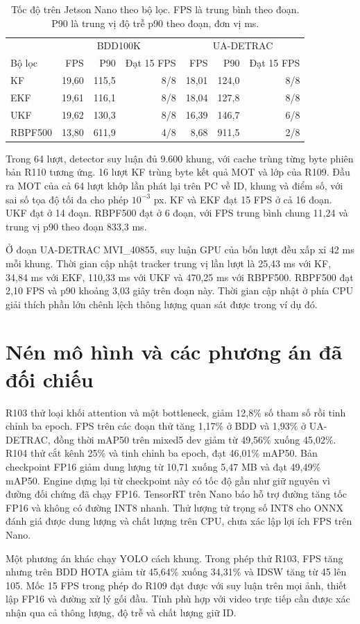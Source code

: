 \begin{table}[htbp]\centering\small
\caption{Tốc độ trên Jetson Nano theo bộ lọc. FPS là trung bình theo đoạn. P90 là trung vị độ trễ p90 theo đoạn, đơn vị ms.}\label{tab:nano-r114}
\begin{tabular}{@{}lrrrrrr@{}}\toprule
 & \multicolumn{3}{c}{BDD100K} & \multicolumn{3}{c}{UA-DETRAC}\\
Bộ lọc & FPS & P90 & Đạt 15 FPS & FPS & P90 & Đạt 15 FPS\\\midrule
KF & 19,60 & 115,5 & 8/8 & 18,01 & 124,0 & 8/8\\
EKF & 19,61 & 116,1 & 8/8 & 18,04 & 127,8 & 8/8\\
UKF & 19,62 & 130,3 & 8/8 & 16,39 & 146,7 & 6/8\\
RBPF500 & 13,80 & 611,9 & 4/8 & 8,68 & 911,5 & 2/8\\\bottomrule
\end{tabular}
\end{table}

Trong 64 lượt, detector suy luận đủ 9.600 khung, với cache trùng từng byte phiên bản R110 tương ứng. 16 lượt KF trùng byte kết quả MOT và lớp của R109. Đầu ra MOT của cả 64 lượt khớp lần phát lại trên PC về ID, khung và điểm số, với sai số tọa độ tối đa cho phép $10^{-3}$ px. KF và EKF đạt 15 FPS ở cả 16 đoạn. UKF đạt ở 14 đoạn. RBPF500 đạt ở 6 đoạn, với FPS trung bình chung 11,24 và trung vị p90 theo đoạn 833,3 ms.

Ở đoạn UA-DETRAC MVI\_40855, suy luận GPU của bốn lượt đều xấp xỉ 42 ms mỗi khung. Thời gian cập nhật tracker trung vị lần lượt là 25,43 ms với KF, 34,84 ms với EKF, 110,33 ms với UKF và 470,25 ms với RBPF500. RBPF500 đạt 2,10 FPS và p90 khoảng 3,03 giây trên đoạn này. Thời gian cập nhật ở phía CPU giải thích phần lớn chênh lệch thông lượng quan sát được trong ví dụ đó.

\section{Nén mô hình và các phương án đã đối chiếu}
R103 thử loại khối attention và một bottleneck, giảm 12,8\% số tham số rồi tinh chỉnh ba epoch. FPS trên các đoạn thử tăng 1,17\% ở BDD và 1,93\% ở UA-DETRAC, đồng thời mAP50 trên mixed5 dev giảm từ 49,56\% xuống 45,02\%. R104 thử cắt kênh 25\% và tinh chỉnh ba epoch, đạt 46,01\% mAP50. Bản checkpoint FP16 giảm dung lượng từ 10,71 xuống 5,47 MB và đạt 49,49\% mAP50. Engine dựng lại từ checkpoint này có tốc độ gần như giữ nguyên vì đường đối chứng đã chạy FP16. TensorRT trên Nano báo hỗ trợ đường tăng tốc FP16 và không có đường INT8 nhanh. Thử lượng tử trọng số INT8 cho ONNX đánh giá được dung lượng và chất lượng trên CPU, chưa xác lập lợi ích FPS trên Nano.

Một phương án khác chạy YOLO cách khung. Trong phép thử R103, FPS tăng nhưng trên BDD HOTA giảm từ 45,64\% xuống 34,31\% và IDSW tăng từ 45 lên 105. Mốc 15 FPS trong phép đo R109 đạt được với suy luận trên mọi ảnh, thiết lập FP16 và đường xử lý gối đầu. Tính phù hợp với video trực tiếp cần được xác nhận qua cả thông lượng, độ trễ và chất lượng giữ ID.
